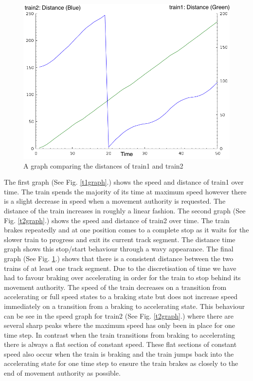 \begin{figure}

\begin{center}
\includegraphics[scale=0.5]{t1t2graph.png}
\end{center}
\caption{A graph comparing the distances of train1 and train2}
\label{t1t2graph}
\end{figure}

The first graph (See Fig. \ref{t1graph}.) shows the speed and distance of train1 over time. The train spends the majority of its time at maximum speed however there is a slight decrease in speed when a movement authority is requested. The distance of the train increases in roughly a linear fashion. The second graph (See Fig. \ref{t2graph}.) shows the speed and distance of train2 over time. The train brakes repeatedly and at one position comes to a complete stop as it waits for the slower train to progress and exit its current track segment. The distance time graph shows this stop/start behaviour through a wavy appearance. The final graph (See Fig. \ref{t1t2graph}.) shows that there is a consistent distance between the two trains of at least one track segment. Due to the discretisation of time we have had to favour braking over accelerating in order for the train to stop behind its movement authority. The speed of the train decreases on a transition from accelerating or full speed states to a braking state but does not increase speed immediately on a transition from a braking to accelerating state. This behaviour can be see in the speed graph for train2 (See Fig. \ref{t2graph}.) where there are several sharp peaks where the maximum speed has only been in place for one time step. In contrast when the train transitions from braking to accelerating there is always a flat section of constant speed. These flat sections of constant speed also occur when the train is braking and the train jumps back into the accelerating state for one time step to ensure the train brakes as closely to the end of movement authority as possible.


